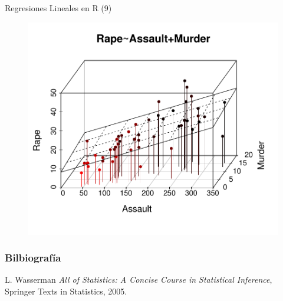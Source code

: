 \documentclass[handout]{beamer}
\begin{document}
\begin{frame}{Regresiones Lineales en R (9)}
 
\begin{figure}[h!]
	\centering
	\includegraphics[scale=0.6]{imagenes/reg3d.pdf}
\end{figure}
 
\end{frame}

\begin{frame}[allowframebreaks]\scriptsize
\frametitle{Bilbiografía}
\begin{thebibliography}{8}

L. Wasserman \emph{All of Statistics: A Concise Course in Statistical Inference}, Springer Texts in Statistics, 2005.
\end{thebibliography}


\end{frame}




\end{document}

